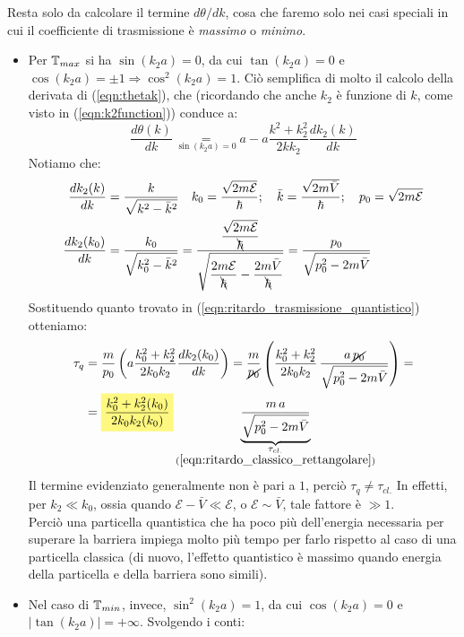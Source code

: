\documentclass[../../FisicaTeorica.tex]{subfiles}
\begin{document}
Resta solo da calcolare il termine $d\theta/dk$, cosa che faremo solo nei casi speciali in cui il coefficiente di trasmissione è \textit{massimo} o \textit{minimo}.
\begin{itemize}
\item Per $\mathbb{T}_{max}$ si ha $\sin(k_2 a)=0$, da cui $\tan(k_2 a)=0$ e $\cos(k_2 a)=\pm 1\Rightarrow \cos^2(k_2 a)=1$. Ciò semplifica di molto il calcolo della derivata di (\ref{eqn:thetak}), che (ricordando che anche $k_2$ è funzione di $k$, come visto in (\ref{eqn:k2function})) conduce a:
\[
\frac{d\theta(k)}{dk}\underset{\sin(k_2 a)=0}{=}a-a\frac{k^2+k_2^2}{2k k_2}\frac{dk_2(k)}{dk}
\]
Notiamo che:
\begin{align*}
\frac{dk_2(k)}{dk}&=\frac{k}{\sqrt{k^2-\bar{k}^2}} \quad k_0=\frac{\sqrt{2m\mathcal{E}}}{\hbar}; \quad \bar{k}=\frac{\sqrt{2m\bar{V}}}{\hbar}; \quad p_0 = \sqrt{2m\mathcal{E}}\\
\frac{dk_2(k_0)}{dk}&=\frac{k_0}{\sqrt{k_0^2-\bar{k}^2}}=\frac{\displaystyle \frac{\sqrt{2m\mathcal{E}}}{\bcancel{\hbar}}}{\displaystyle \sqrt{\frac{2m\mathcal{E}}{\bcancel{\hbar}}-\frac{2m\bar{V}}{\bcancel{\hbar}}}} = \frac{p_0}{\sqrt{p_0^2-2m\bar{V}}}
\end{align*}
Sostituendo quanto trovato in (\ref{eqn:ritardo_trasmissione_quantistico}) otteniamo:
\begin{align}\nonumber
\tau_q &=\frac{m}{p_0}\left(a\frac{k_0^2+k_2^2}{2k_0k_2} \frac{dk_2(k_0)}{dk}\right) = \frac{m}{\cancel{p_0}}\left(\frac{k_0^2+k_2^2}{2k_0k_2}\,\frac{a\,\cancel{p_0}}{\sqrt{p_0^2-2m\bar{V}}}\right)=\\
&=\hlc{Yellow}{\frac{k_0^2+k_2^2(k_0)}{2k_0 k_2(k_0)}} \underbrace{\frac{m\,a}{\sqrt{p_0^2-2m\bar{V}}}}_{\substack{\tau_{cl.}\\(\ref{eqn:ritardo_classico_rettangolare})}}
\label{eqn:tauq_Tmax}
\end{align}
Il termine evidenziato generalmente non è pari a $1$, perciò $\tau_q \neq \tau_{cl.}$ In effetti, per $k_2 \ll k_0$, ossia quando $\mathcal{E}-\bar{V}\ll\mathcal{E}$, o $\mathcal{E}\sim \bar{V}$, tale fattore è $\gg 1$.\\
Perciò una particella quantistica che ha poco più dell'energia necessaria per superare la barriera impiega molto più tempo per farlo rispetto al caso di una particella classica (di nuovo, l'effetto quantistico è massimo quando energia della particella e della barriera sono simili).
\item Nel caso di $\mathbb{T}_{min}$, invece, $\sin^2(k_2a)=1$, da cui $\cos(k_2a)=0$ e $|\tan(k_2a)|=+\infty$. Svolgendo i conti:

\end{itemize}
\end{document}
